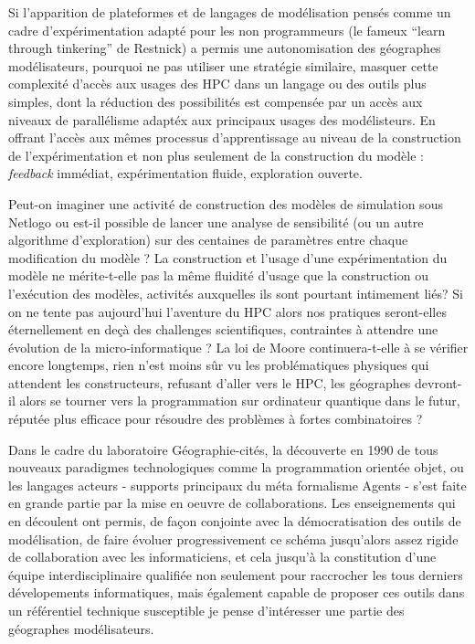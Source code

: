 Si l'apparition de plateformes et de langages de modélisation pensés comme un cadre d'expérimentation adapté pour les non programmeurs (le fameux \foreignquote{english}{learn through tinkering} de Restnick) a permis une autonomisation des géographes modélisateurs, pourquoi ne pas utiliser une stratégie similaire, masquer cette complexité d'accès aux usages des HPC dans un langage ou des outils plus simples, dont la réduction des possibilités est compensée par un accès aux niveaux de parallélisme adaptéx aux principaux usages des modélisteurs. En offrant l'accès aux mêmes processus d'apprentissage au niveau de la construction de l'expérimentation et non plus seulement de la construction du modèle : \textit{feedback} immédiat, expérimentation fluide, exploration ouverte.

Peut-on imaginer une activité de construction des modèles de simulation sous Netlogo ou est-il possible de lancer une analyse de sensibilité (ou un autre algorithme d'exploration) sur des centaines de paramètres entre chaque modification du modèle ? La construction et l'usage d'une expérimentation du modèle ne mérite-t-elle pas la même fluidité d'usage que la construction ou l'exécution des modèles, activités auxquelles ils sont pourtant intimement liés? Si on ne tente pas aujourd'hui l'aventure du HPC alors nos pratiques seront-elles éternellement en deçà des challenges scientifiques, contraintes à attendre une évolution de la micro-informatique ? La loi de Moore continuera-t-elle à se vérifier encore longtemps, rien n'est moins sûr vu les problématiques physiques qui attendent les constructeurs, refusant d'aller vers le HPC, les géographes devront-il alors se tourner vers la programmation sur ordinateur quantique dans le futur, réputée plus efficace pour résoudre des problèmes à fortes combinatoires ?

Dans le cadre du laboratoire Géographie-cités, la découverte en 1990 de tous nouveaux paradigmes technologiques comme la programmation orientée objet, ou les langages acteurs - supports principaux du méta formalisme Agents - s'est faite en grande partie par la mise en oeuvre de collaborations. Les enseignements qui en découlent ont permis, de façon conjointe avec la démocratisation des outils de modélisation, de faire évoluer progressivement ce schéma jusqu'alors assez rigide de collaboration avec les informaticiens, et cela jusqu’à la constitution d’une équipe interdisciplinaire qualifiée non seulement pour raccrocher les tous derniers dévelopements informatiques, mais également capable de proposer ces outils dans un référentiel technique susceptible je pense d'intéresser une partie des géographes modélisateurs.

